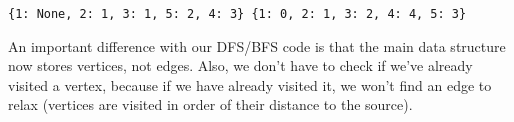 \begin{Verbatim}
{1: None, 2: 1, 3: 1, 5: 2, 4: 3} {1: 0, 2: 1, 3: 2, 4: 4, 5: 3}
\end{Verbatim}


An important difference with our DFS/BFS code is that the main data structure now stores vertices, not edges.
Also, we don't have to check if we've already visited a vertex, because if we have already visited it, we won't find an edge to relax (vertices are visited in order of their distance to the source).
